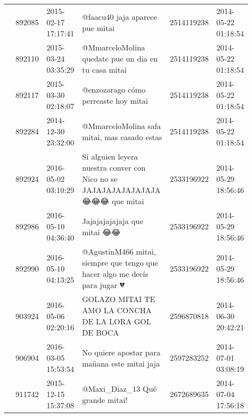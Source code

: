\begin{tabular}{llllrl}
           & 892085  & 2015-02-17 17:17:41 &                                                                                                              @faacu40 jaja aparece pue mitai &  2514119238 & 2014-05-22 01:18:54 \\
           & 892110  & 2015-03-24 03:35:29 &                                                                                          @MmarceloMolina quedate pue un dia en tu casa mitai &  2514119238 & 2014-05-22 01:18:54 \\
           & 892117  & 2015-03-30 02:18:07 &                                                                                                         @enzozarago cómo perreaste hoy mitai &  2514119238 & 2014-05-22 01:18:54 \\
           & 892284  & 2014-12-30 23:32:00 &                                                                                                 @MmarceloMolina safa mitai, mas casado estas &  2514119238 & 2014-05-22 01:18:54 \\
           & 892924  & 2016-05-02 03:10:29 &                                                               Si alguien leyera nuestra conver con Nico no se JAJAJAJAJAJAJAJA 😂😂😂 que mitai &  2533196922 & 2014-05-29 18:56:46 \\
           & 892986  & 2016-05-10 04:36:40 &                                                                                                                  Jajajajajajaja que mitai 😂😂 &  2533196922 & 2014-05-29 18:56:46 \\
           & 892990  & 2016-05-10 04:13:25 &                                                                   @AgustinM466 mitai, siempre que tengo que hacer algo me decís para jugar 💔 &  2533196922 & 2014-05-29 18:56:46 \\
           & 903924  & 2016-05-06 02:20:16 &                                                                                         GOLAZO MITAI TE AMO LA CONCHA DE LA LORA GOL DE BOCA &  2596870818 & 2014-06-30 20:42:21 \\
           & 906904  & 2016-03-05 15:53:54 &                                                                                                No quiere apostar para mañana este mitai jaja &  2597283252 & 2014-07-01 03:08:19 \\
           & 911742  & 2015-12-15 15:37:08 &                                                                                                              @Maxi\_Diaz\_13 Qué grande mitai! &  2672689635 & 2014-07-04 17:56:18 \\

\end{tabular}
